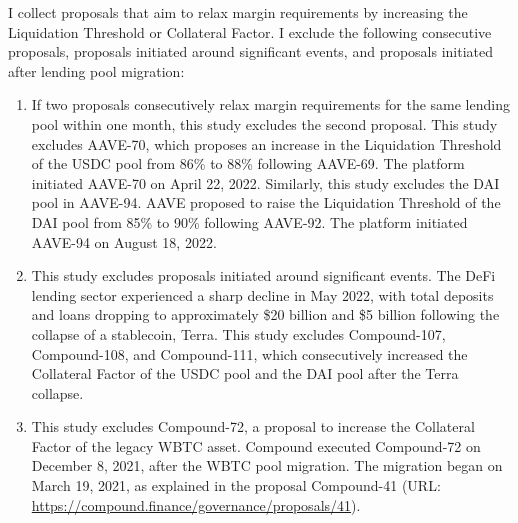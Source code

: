    I collect proposals that aim to relax margin requirements by increasing the Liquidation Threshold or Collateral Factor. I exclude the following consecutive proposals, proposals initiated around significant events, and proposals initiated after lending pool migration:
    \begin{enumerate}
  
        \item If two proposals consecutively relax margin requirements for the same lending pool within one month, this study excludes the second proposal. This study excludes AAVE-70, which proposes an increase in the Liquidation Threshold of the USDC pool from 86\% to 88\% following AAVE-69. The platform initiated AAVE-70 on April 22, 2022. Similarly, this study excludes the DAI pool in AAVE-94. AAVE proposed to raise the Liquidation Threshold of the DAI pool from 85\% to 90\% following AAVE-92. The platform initiated AAVE-94 on August 18, 2022.
        \item This study excludes proposals initiated around significant events. The DeFi lending sector experienced a sharp decline in May 2022, with total deposits and loans dropping to approximately \$20 billion and \$5 billion following the collapse of a stablecoin, Terra. This study excludes Compound-107, Compound-108, and Compound-111, which consecutively increased the Collateral Factor of the USDC pool and the DAI pool after the Terra collapse.
        \item This study excludes Compound-72, a proposal to increase the Collateral Factor of the legacy WBTC asset. Compound executed Compound-72 on December 8, 2021, after the WBTC pool migration. The migration began on March 19, 2021, as explained in the proposal Compound-41 (URL: \href{https://compound.finance/governance/proposals/41}{https://compound.finance/governance/proposals/41}).
    \end{enumerate}
